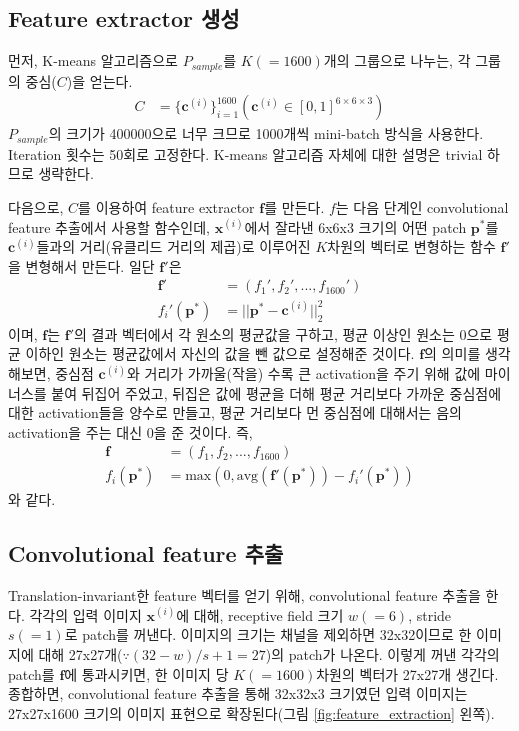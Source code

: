 \documentclass[a4paper,9pt]{article}
\begin{document}
\begin{multicols*}{2}
\subsection{Feature extractor 생성}
\label{sec:feature_extractor}

먼저, K-means 알고리즘으로 $P_{sample}$를 $K(=1600)$개의 그룹으로 나누는, 각 그룹의 중심($C$)을 얻는다.
\begin{align*}
    C &= \{ \mathbf{c}^{(i)} \}_{i=1}^{1600} ( \mathbf{c}^{(i)} \in [0, 1]^{6 \times 6 \times 3} )
\end{align*}
$P_{sample}$의 크기가 400000으로 너무 크므로 1000개씩 mini-batch 방식을 사용한다.
Iteration 횟수는 50회로 고정한다.
K-means 알고리즘 자체에 대한 설명은 trivial 하므로 생략한다.

다음으로, $C$를 이용하여 feature extractor $\mathbf{f}$를 만든다.
$f$는 다음 단계인 convolutional feature 추출에서 사용할 함수인데, $\mathbf{x}^{(i)}$에서 잘라낸 6x6x3 크기의 어떤 patch $\mathbf{p}^{*}$를 $\mathbf{c}^{(i)}$들과의 거리(유클리드 거리의 제곱)로 이루어진 $K$차원의 벡터로 변형하는 함수 $\mathbf{f}'$을 변형해서 만든다.
일단 $\mathbf{f}'$은
\begin{align*}
    \mathbf{f}' &= (f_{1}', f_{2}', ..., f_{1600}') \\
    f_{i}'(\mathbf{p}^{*}) &= || \mathbf{p}^{*} - \mathbf{c}^{(i)} ||_2^2
\end{align*}
이며, $\mathbf{f}$는 $\mathbf{f}'$의 결과 벡터에서 각 원소의 평균값을 구하고, 평균 이상인 원소는 0으로 평균 이하인 원소는 평균값에서 자신의 값을 뺀 값으로 설정해준 것이다.
$\mathbf{f}$의 의미를 생각해보면, 중심점 $\mathbf{c}^{(i)}$와 거리가 가까울(작을) 수록 큰 activation을 주기 위해 값에 마이너스를 붙여 뒤집어 주었고, 뒤집은 값에 평균을 더해 평균 거리보다 가까운 중심점에 대한 activation들을 양수로 만들고, 평균 거리보다 먼 중심점에 대해서는 음의 activation을 주는 대신 0을 준 것이다.
즉,
\begin{align*}
    \mathbf{f} &= (f_{1}, f_{2}, ..., f_{1600}) \\
    f_{i}(\mathbf{p}^{*}) &= \text{max} ( 0, \text{avg} (\mathbf{f}'(\mathbf{p}^{*})) - f_{i}'(\mathbf{p}^{*}) )
\end{align*}
와 같다.

\subsection{Convolutional feature 추출}

Translation-invariant한 feature 벡터를 얻기 위해, convolutional feature 추출을 한다.
각각의 입력 이미지 $\mathbf{x}^{(i)}$에 대해, receptive field 크기 $w(=6)$, stride $s(=1)$로 patch를 꺼낸다.
이미지의 크기는 채널을 제외하면 32x32이므로 한 이미지에 대해 27x27개($\because (32-w)/s+1=27$)의 patch가 나온다.
이렇게 꺼낸 각각의 patch를 $\mathbf{f}$에 통과시키면, 한 이미지 당 $K(=1600)$차원의 벡터가 27x27개 생긴다.
종합하면, convolutional feature 추출을 통해 32x32x3 크기였던 입력 이미지는 27x27x1600 크기의 이미지 표현으로 확장된다(그림 \ref{fig:feature_extraction} 왼쪽).


\end{multicols*}
\end{document}
